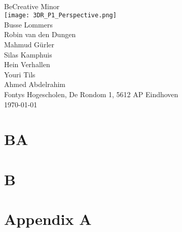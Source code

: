 \documentclass[11pt, a4paper]{report}
\begin{document}
\pagestyle{empty}
\centering
\fontsize{2cm}{2cm}\selectfont{Audio Digital Signal Processor} \\
\vspace{2mm}
\large BeCreative Minor\\
\normalsize
\vspace{4cm}
\texttt{[image: 3DR\_P1\_Perspective.png]}\\
\vfill
\normalsize Busse Lommers \\
Robin van den Dungen \\
Mahmud Gürler \\
Silas Kamphuis \\
Hein Verhallen \\
Youri Tils \\
Ahmed Abdelrahim \\
Fontys Hogescholen, De Rondom 1, 5612 AP Eindhoven \\
\today

\begin{justify}


\newpage
\tableofcontents
\thispagestyle{empty}

\listoffigures
\thispagestyle{empty}

\listoftables
\thispagestyle{empty}

\newpage
\pagestyle{plain}
\setcounter{page}{1}


\chapter{BA}
	
	
\chapter{B}
	
	


\printbibliography[
heading=bibintoc,
title={Bibliography}
]



\appendix

\chapter{Appendix A}


	\end{justify}
\end{document}
